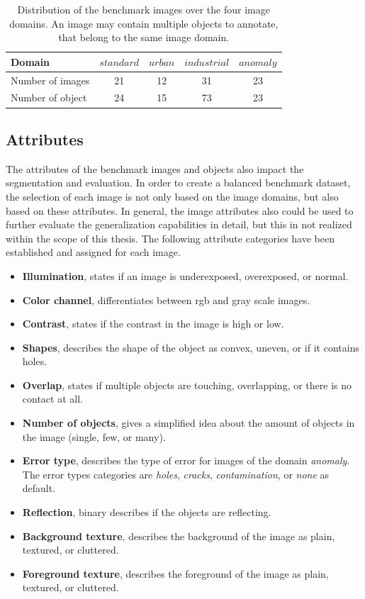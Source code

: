 \begin{table}[h!]
	\centering
	\begin{tabular}{l|c c c c}
		Domain				& $ standard $ & $ urban $ & $ industrial $ & $ anomaly $ \\
		\hline
		Number of images 	& 21 & 12 & 31 & 23 \\
		Number of object 	& 24 & 15 & 73 & 23 \\
	\end{tabular}
	\caption[Overview of image domains]{
		Distribution of the benchmark images over the four image domains.
		An image may contain multiple objects to annotate, that belong to the same image domain.
	} \label{tab:ch4:domains_overview}
\end{table}



\subsection{Attributes}\label{ord:ch4:sec2:subsec2}

The attributes of the benchmark images and objects also impact the segmentation and evaluation.
In order to create a balanced benchmark dataset, the selection of each image is not only based on the image domains, but also based on these attributes.
In general, the image attributes also could be used to further evaluate the generalization capabilities in detail, but this in not realized within the scope of this thesis.
The following attribute categories have been established and assigned for each image.

\begin{itemize}
	\item \textbf{Illumination}, states if an image is underexposed, overexposed, or normal.
	\item \textbf{Color channel}, differentiates between \gls{rgb} and gray scale images.
	\item \textbf{Contrast}, states if the contrast in the image is high or low.
	\item \textbf{Shapes}, describes the shape of the object as convex, uneven, or if it contains holes.
	\item \textbf{Overlap}, states if multiple objects are touching, overlapping, or there is no contact at all.
	\item \textbf{Number of objects}, gives a simplified idea about the amount of objects in the image (single, few, or many).
	\item \textbf{Error type}, describes the type of error for images of the domain \textit{anomaly}.
	The error types categories are \textit{holes}, \textit{cracks}, \textit{contamination}, or \textit{none} as default.
	\item \textbf{Reflection}, binary describes if the objects are reflecting.
	\item \textbf{Background texture}, describes the background of the image as plain, textured, or cluttered.
	\item \textbf{Foreground texture}, describes the foreground of the image as plain, textured, or cluttered.
\end{itemize}